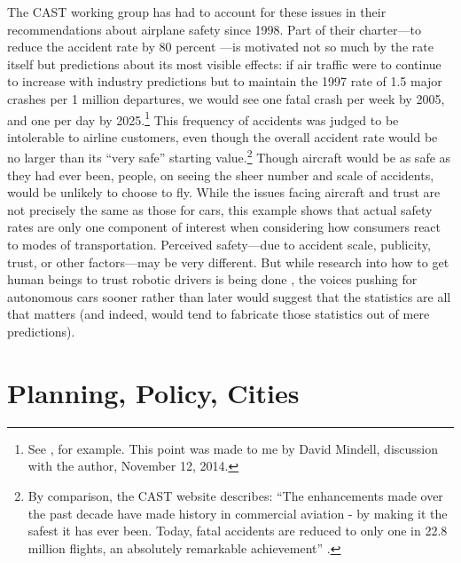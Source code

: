 The CAST working group has had to account for these issues in their
recommendations about airplane safety since 1998. Part of their charter---to
reduce the accident rate by 80 percent \cite[p. 28]{PARCCAST}---is
motivated not so much by the rate itself but predictions about its
most visible effects:  if air traffic were to continue to increase
with industry predictions but to maintain the 1997 rate of 1.5 major
crashes per 1 million departures, we would see one fatal crash per
week by 2005, and one per day by 2025.\footnote{See
  \cite{predictmorecrashes},
  for example. This point was made to me by David Mindell, discussion
  with the author, November 12, 2014.}
This frequency of accidents was judged to be intolerable to
airline customers, even though the overall accident rate would be no
larger than its ``very safe'' \cite[p. 129]{PARCCAST} starting
value.\footnote{By comparison, the CAST website describes: ``The
  enhancements made over the past decade have made history in
  commercial aviation - by making it the safest it has ever been.
  Today, fatal accidents are reduced to only one in 22.8 million
  flights, an absolutely remarkable achievement'' \cite{cast-safety.org}.} Though
aircraft would be as safe as they 
had ever been, people, on seeing the sheer number and scale of
accidents, would be unlikely to choose to fly. While the issues facing
aircraft and trust are not precisely the same as those for cars, this
example shows that actual safety rates are only
one component of interest when considering how consumers react to
modes of transportation. Perceived safety---due to accident scale,
publicity, trust, or other factors---may be very different. But
while research into how to get human beings to trust robotic drivers
is being done \cite{rossTrust}, the voices pushing for autonomous cars sooner
rather than later would suggest that the statistics are all that
matters (and indeed, would tend to fabricate those statistics out of
mere predictions). 


\section{Planning, Policy, Cities}

